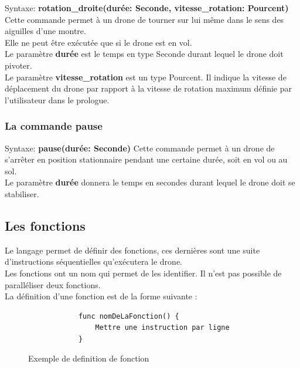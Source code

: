 \documentclass[12pt]{article}
\begin{document}
		\quad Syntaxe: \textbf{rotation\_droite(durée: Seconde, vitesse\_rotation: Pourcent)}  \bigbreak
			Cette commande permet à un drone de tourner sur lui même dans le sens des aiguilles d'une montre.\\ 
			Elle ne peut être exécutée que si le drone est en vol.\\
			Le paramètre \textbf{durée} est le temps en type Seconde durant lequel le drone doit pivoter.\\
			Le paramètre \textbf{vitesse\_rotation} est un type Pourcent. Il indique la vitesse de déplacement du drone par rapport à la vitesse de rotation maximum définie par l'utilisateur dans le prologue.  \\

	\subsubsection{La commande pause}
		\quad Syntaxe: \textbf{pause(durée: Seconde)}  \bigbreak
			Cette commande permet à un drone de s'arrêter en position stationnaire pendant une certaine durée, soit en vol ou au sol. \\
			Le paramètre \textbf{durée} donnera le temps en secondes durant lequel le drone doit se stabiliser. \\
	
\subsection{Les fonctions}
Le langage permet de définir des fonctions, ces dernières sont une suite d'instructions séquentielles qu'exécutera le drone.\\
Les fonctions ont un nom qui permet de les identifier.
Il n'est pas possible de paralléliser deux fonctions.\\
La définition d'une fonction est de la forme suivante :

    \begin{figure}[h!]
        \begin{center}
            \begin{verbatim}
            func nomDeLaFonction() {
                Mettre une instruction par ligne
            }
            \end{verbatim}
        \end{center}
        \caption{Exemple de definition de fonction}
        \label{Exemple de definition de fonction}
    \end{figure}
    
\end{document}
